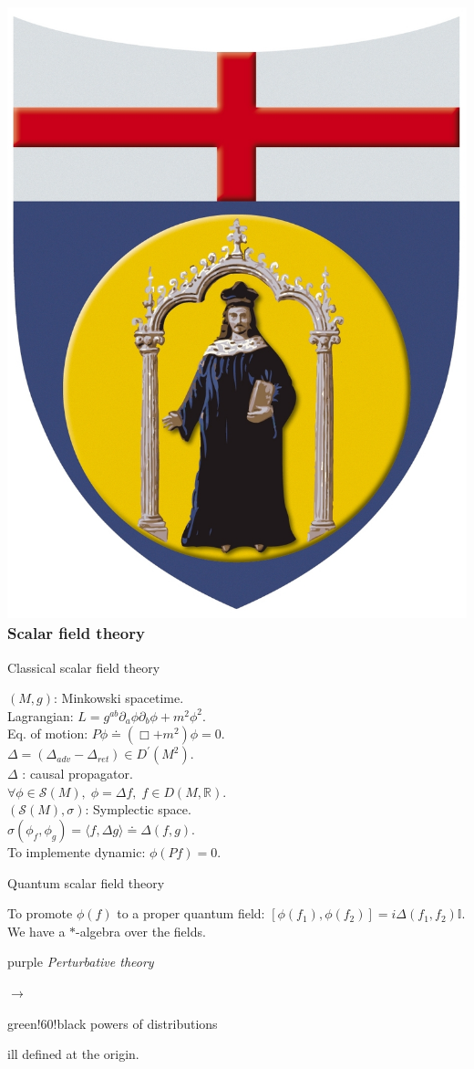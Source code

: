 \documentclass[a4paper,11pt]{beamer} %
\newcommand{\LogoUnivGenova}{\protect\includegraphics[scale=0.015]{fig_genova.JPG}} %
\begin{document}
\begin{frame}
\frametitle{\LogoUnivGenova {} Scalar field theory \; \cite{ThomasPhD} \cite{KaiPhD}}
\begin{block}{Classical scalar field theory}
\vspace{-4mm}
\begin{multicols}{2}
\begin{setstretch}{1.4}
\begin{scriptsize}
$(M,g)$: Minkowski spacetime. \\
Lagrangian: $L = g^{ab} \partial_a \phi \partial_b \phi + m^2 \phi^2$. \\
Eq. of motion: $P \phi \doteq (\Box + m^2)\phi=0$. \\
$\Delta = (\Delta_{adv} - \Delta_{ret}) \in D^{\prime}(M^2)$.\\
$\Delta$ : causal propagator.\\
$\forall \phi \in \mathcal{S}(M), \; \phi = \Delta f, \; f\in D(M,\mathbb{R})$. \\
$\left(\mathcal{S}(M), \sigma \right)$: Symplectic space.\\
$\sigma(\phi_f,\phi_g) = \langle f, \Delta g \rangle \doteq \Delta(f,g)$.\\
To implemente dynamic: $\phi(Pf)=0$. \\
\end{scriptsize}
\end{setstretch}
\end{multicols}
\vspace{-4mm}
\end{block}
\begin{block}{Quantum scalar field theory}
\begin{setstretch}{1.4}
\begin{scriptsize}
To promote $\phi(f)$ to a proper quantum field: \quad $[\phi(f_1),\phi(f_2)] = i \Delta(f_1,f_2) \mathbb{I}$. \\
\indent We have a $\ast$-algebra over the fields. \\
\begin{color}{purple} \emph{Perturbative theory} \end{color} $\to$ \begin{color}{green!60!black} powers of distributions \end{color}ill defined at the origin.\\
\end{scriptsize}
\begin{tiny}
\vspace{-3mm}

\end{tiny}
\end{setstretch}
\end{block}
\end{frame}
\end{document}
